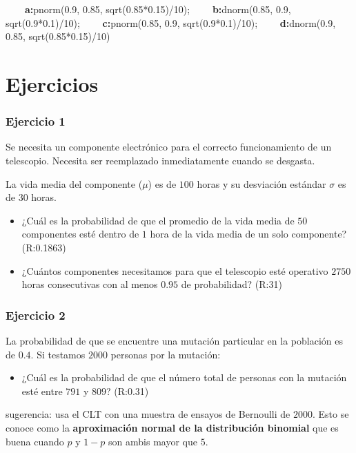 \documentclass[
]{book}
\providecommand{\tightlist}{%
  \setlength{\itemsep}{0pt}\setlength{\parskip}{0pt}}
\begin{document}
\textbf{\(\qquad\)a:}pnorm(0.9, 0.85, sqrt(0.85*0.15)/10); \textbf{\(\qquad\)b:}dnorm(0.85, 0.9,
sqrt(0.9*0.1)/10); \textbf{\(\qquad\)c:}pnorm(0.85, 0.9, sqrt(0.9*0.1)/10); \textbf{\(\qquad\)d:}dnorm(0.9, 0.85, sqrt(0.85*0.15)/10)

\hypertarget{ejercicios-9}{%
\section{Ejercicios}\label{ejercicios-9}}

\hypertarget{ejercicio-1-8}{%
\subsubsection{Ejercicio 1}\label{ejercicio-1-8}}

Se necesita un componente electrónico para el correcto funcionamiento de un telescopio. Necesita ser reemplazado inmediatamente cuando se desgasta.

La vida media del componente (\(\mu\)) es de \(100\) horas y su desviación estándar \(\sigma\) es de \(30\) horas.

\begin{itemize}
\item
  ¿Cuál es la probabilidad de que el promedio de la vida media de \(50\) componentes esté dentro de \(1\) hora de la vida media de un solo componente? (R:0.1863)
\item
  ¿Cuántos componentes necesitamos para que el telescopio esté operativo \(2750\) horas consecutivas con al menos \(0.95\) de probabilidad? (R:31)
\end{itemize}

\hypertarget{ejercicio-2-8}{%
\subsubsection{Ejercicio 2}\label{ejercicio-2-8}}

La probabilidad de que se encuentre una mutación particular en la población es de \(0.4\). Si testamos \(2000\) personas por la mutación:

\begin{itemize}
\tightlist
\item
  ¿Cuál es la probabilidad de que el número total de personas con la mutación esté entre \(791\) y \(809\)? (R:0.31)
\end{itemize}

sugerencia: usa el CLT con una muestra de ensayos de Bernoulli de \(2000\). Esto se conoce como la \textbf{aproximación normal de la distribución binomial} que es buena cuando \(p\) y \(1-p\) son ambis mayor que \(5\).
\end{document}

